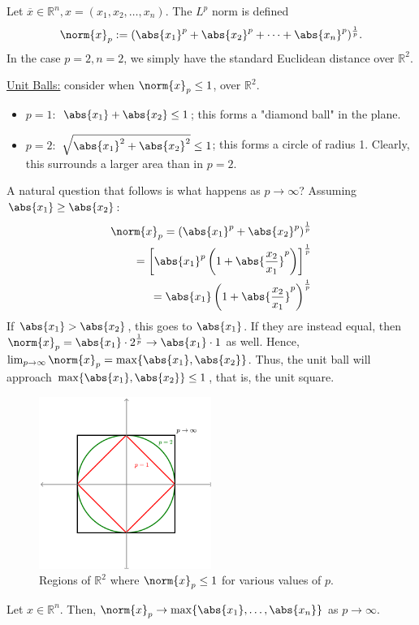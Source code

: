 \begin{example}
    Let $\overline{x} \in \mathbb{R}^n, x = (x_1, x_2, \dots, x_n)$. The $L^p$ norm is defined \[
    \norm{x}_p := (\abs{x_1}^p + \abs{x_2}^p + \cdots + \abs{x_n}^p)^{\frac{1}{p}}.    
    \]
    In the case $p = 2, n = 2$, we simply have the standard Euclidean distance over $\mathbb{R}^2$.

    \underline{Unit Balls:} consider when $\norm{x}_p \leq 1$, over $\mathbb{R}^2$.
    \begin{itemize}
        \item $p = 1:$ $\abs{x_1} + \abs{x_2} \leq 1$; this forms a "diamond ball" in the plane.
        \item $p = 2:$ $\sqrt{\abs{x_1}^{2}+\abs{x_2}^2} \leq 1$; this forms a circle of radius 1. Clearly, this surrounds a larger area than in $p =2$.
    \end{itemize}
    A natural question that follows is what happens as $p \to \infty$? Assuming $\abs{x_1} \geq \abs{x_2}$:
    \begin{align*}
        \norm{x}_p = \left(\abs{x_1}^p + \abs{x_2}^p\right)^{\frac{1}{p}}\\
        = \left[\abs{x_1}^p\left(1 + \abs{\frac{x_2}{x_1}}^p\right)\right]^{\frac{1}{p}}\\
        = \abs{x_1}\left(1 + \abs{\frac{x_2}{x_1}}^p\right)^{\frac{1}{p}}
    \end{align*}
    If $\abs{x_1} > \abs{x_2}$, this goes to $\abs{x_1}$. If they are instead equal, then $\norm{x}_p = \abs{x_1}\cdot 2^{\frac{1}{p}} \to \abs{x_1} \cdot 1$ as well. Hence, $\lim_{p \to \infty} \norm{x}_p = \max\{\abs{x_1}, \abs{x_2}\}$. Thus, the unit ball will approach $\max \{\abs{x_1}, \abs{x_2}\} \leq 1$, that is, the unit square.
\end{example}
\begin{figure}[!ht]
    \centering
    \includegraphics[width=0.5\textwidth]{misc/unitballs.png}
    \caption{Regions of $\mathbb{R}^2$ where $\norm{x}_p \leq 1$ for various values of $p$.}
\end{figure}
\begin{proposition}
    Let $x \in \mathbb{R}^n$. Then, $\norm{x}_p \to \max \{\abs{x_1}, \dots, \abs{x_n}\}$ as $p \to \infty$.
\end{proposition}


